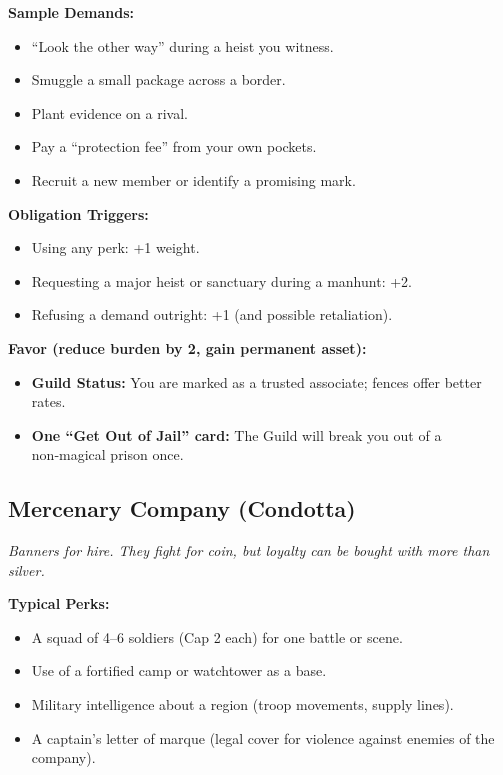 \textbf{Sample Demands:}
\begin{itemize}
  \item “Look the other way” during a heist you witness.
  \item Smuggle a small package across a border.
  \item Plant evidence on a rival.
  \item Pay a “protection fee” from your own pockets.
  \item Recruit a new member or identify a promising mark.
\end{itemize}

\textbf{Obligation Triggers:}
\begin{itemize}
  \item Using any perk: +1 weight.
  \item Requesting a major heist or sanctuary during a manhunt: +2.
  \item Refusing a demand outright: +1 (and possible retaliation).
\end{itemize}

\textbf{Favor (reduce burden by 2, gain permanent asset):}
\begin{itemize}
  \item \textbf{Guild Status:} You are marked as a trusted associate; fences offer better rates.
  \item \textbf{One “Get Out of Jail” card:} The Guild will break you out of a non‑magical prison once.
\end{itemize}

\subsection{Mercenary Company (Condotta)}

\textit{Banners for hire. They fight for coin, but loyalty can be bought with more than silver.}

\textbf{Typical Perks:}
\begin{itemize}
  \item A squad of 4–6 soldiers (Cap 2 each) for one battle or scene.
  \item Use of a fortified camp or watchtower as a base.
  \item Military intelligence about a region (troop movements, supply lines).
  \item A captain’s letter of marque (legal cover for violence against enemies of the company).
\end{itemize}

